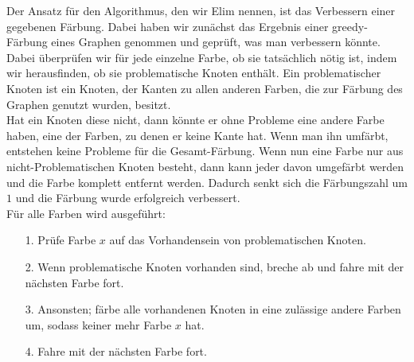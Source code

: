 \documentclass[11pt]{article}
\begin{document}
Der Ansatz für den Algorithmus, den wir Elim nennen, ist das Verbessern einer gegebenen Färbung.
Dabei haben wir zunächst das Ergebnis einer greedy-Färbung eines Graphen genommen und geprüft, was man verbessern könnte. \\

Dabei überprüfen wir für jede einzelne Farbe, ob sie tatsächlich nötig ist, indem wir herausfinden, ob sie problematische Knoten enthält.
Ein problematischer Knoten ist ein Knoten, der Kanten zu allen anderen Farben, die zur Färbung des Graphen genutzt wurden, besitzt. \\
Hat ein Knoten diese nicht, dann könnte er ohne Probleme eine andere Farbe haben, eine der Farben, zu denen er keine Kante hat. Wenn man ihn umfärbt, entstehen keine Probleme für die Gesamt-Färbung.
Wenn nun eine Farbe nur aus nicht-Problematischen Knoten besteht, dann kann jeder davon umgefärbt werden und die Farbe komplett entfernt werden. Dadurch senkt sich die Färbungszahl um $1$ und die Färbung wurde erfolgreich verbessert. \\

Für alle Farben wird ausgeführt: \\
\begin{itemize}
\item[1.] Prüfe Farbe $x$ auf das Vorhandensein von problematischen Knoten.
\item[2.] Wenn problematische Knoten vorhanden sind, breche ab und fahre mit der nächsten Farbe fort.
\item[3.] Ansonsten; färbe alle vorhandenen Knoten in eine zulässige andere Farben um, sodass keiner mehr Farbe $x$ hat.
\item[4.] Fahre mit der nächsten Farbe fort.
\end{itemize}
\end{document}
